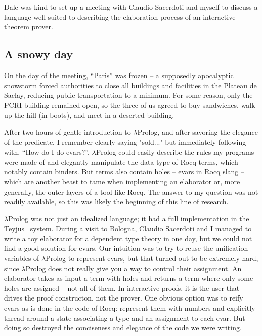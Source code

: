 \documentclass[a4paper, 11pt]{book}
\begin{document}
Dale was kind to set up a meeting with Claudio Sacerdoti and myself to
discuss a language well suited to describing the elaboration process of an
interactive theorem prover.

\subsection{A snowy day}


On the day of the meeting, ``Paris'' was frozen -- a supposedly apocalyptic snowstorm forced
authorities to close all buildings and facilities in the Plateau de Saclay,
reducing public transportation
to a minimum. For some reason, only the PCRI building remained open, so the
three of us agreed to buy sandwiches, walk up the hill (in boots), and meet in
a deserted building.

After two hours of gentle introduction to $\lambda$Prolog, and after savoring
the elegance of the  predicate, I remember clearly saying "sold..."
but immediately following with, ``How do I do evars?''. $\lambda$Prolog could
easily describe the rules my programs were made of and elegantly manipulate the
data type of Rocq terms, which notably contain binders. But terms also contain
holes -- evars in Rocq slang -- which are another beast to tame when implementing an
elaborator or, more generally, the outer layers of a tool like Rocq. The answer
to my question was not readily available, so this was likely the beginning of
this line of research.

$\lambda$Prolog was not just an idealized language; it had a full
implementation in the Teyjus~\cite{teyjus} system. During a visit to Bologna,
Claudio Sacerdoti and I managed to write a toy elaborator for a dependent type
theory in one day, but we could not find a good solution for evars. Our
intuition was to try to reuse the unification variables of $\lambda$Prolog to
represent evars, but that turned out to be extremely hard, since $\lambda$Prolog
does not really give you a way to control their assignment. An elaborator takes
as input a term with holes and returns a term where only some holes are
assigned -- not all of them. In interactive proofs, it is the user
that drives the proof constructon, not the prover.
One obvious option was to reify evars as is done in
the code of Rocq: represent them with numbers and explicitly thread around a
state associating a type and an assignment to each evar. But doing so destroyed
the conciseness and elegance of the code we were writing.
\end{document}
